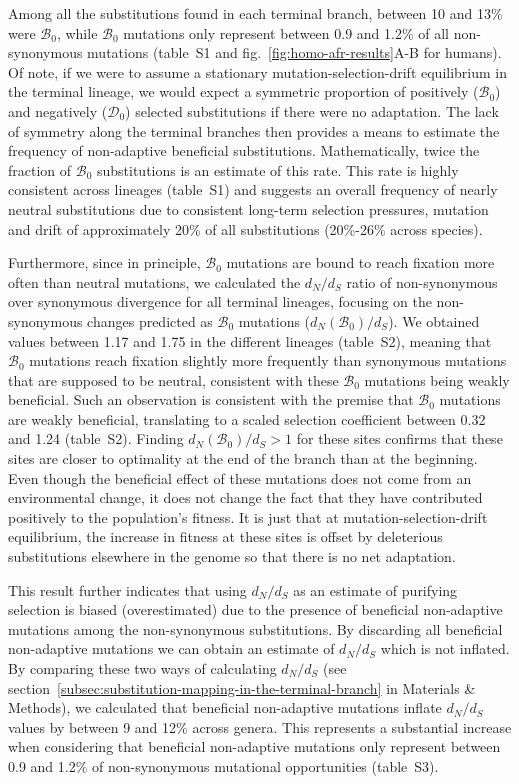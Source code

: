 \documentclass{article}
\newcommand{\dn}{d_N}
\newcommand{\ds}{d_S}
\newcommand{\dnds}{\dn / \ds}
\newcommand{\SphyDel}{\mathcal{D}_0}
\newcommand{\SphyBen}{\mathcal{B}_0}
\begin{document}
    Among all the substitutions found in each terminal branch, between 10 and 13\% were $\SphyBen$, while $\SphyBen$ mutations only represent between 0.9 and 1.2\% of all non-synonymous mutations (table~S1 and fig.~\ref{fig:homo-afr-results}A-B for humans).
    Of note, if we were to assume a stationary mutation-selection-drift equilibrium in the terminal lineage, we would expect a symmetric proportion of positively ($\SphyBen$) and negatively ($\SphyDel$) selected substitutions if there were no adaptation.
    The lack of symmetry along the terminal branches then provides a means to estimate the frequency of non-adaptive beneficial substitutions.
    Mathematically, twice the fraction of $\SphyBen$ substitutions is an estimate of this rate.
    This rate is highly consistent across lineages (table~S1) and suggests an overall frequency of nearly neutral substitutions due to consistent long-term selection pressures, mutation and drift of approximately 20\% of all substitutions (20\%-26\% across species).

    Furthermore, since in principle, $\SphyBen$ mutations are bound to reach fixation more often than neutral mutations, we calculated the $\dnds$ ratio of non-synonymous over synonymous divergence for all terminal lineages, focusing on the non-synonymous changes predicted as $\SphyBen$ mutations ($\dn(\SphyBen) / \ds$).
    We obtained values between 1.17 and 1.75 in the different lineages (table~S2), meaning that $\SphyBen$ mutations reach fixation slightly more frequently than synonymous mutations that are supposed to be neutral, consistent with these $\SphyBen$ mutations being weakly beneficial.
    Such an observation is consistent with the premise that $\SphyBen$ mutations are weakly beneficial, translating to a scaled selection coefficient between 0.32 and 1.24 (table~S2).
    Finding $\dn(\SphyBen) / \ds > 1$ for these sites confirms that these sites are closer to optimality at the end of the branch than at the beginning.
    Even though the beneficial effect of these mutations does not come from an environmental change, it does not change the fact that they have contributed positively to the population’s fitness.
    It is just that at mutation-selection-drift equilibrium, the increase in fitness at these sites is offset by deleterious substitutions elsewhere in the genome so that there is no net adaptation.

    This result further indicates that using $\dnds$ as an estimate of purifying selection is biased (overestimated) due to the presence of beneficial non-adaptive mutations among the non-synonymous substitutions.
    By discarding all beneficial non-adaptive mutations we can obtain an estimate of $\dnds$ which is not inflated.
    By comparing these two ways of calculating $\dnds$ (see section~\ref{subsec:substitution-mapping-in-the-terminal-branch} in Materials \& Methods), we calculated that beneficial non-adaptive mutations inflate $\dnds$ values by between 9 and 12\% across genera. This represents a substantial increase when considering that beneficial non-adaptive mutations only represent between 0.9 and 1.2\% of non-synonymous mutational opportunities (table~S3).
\end{document}
